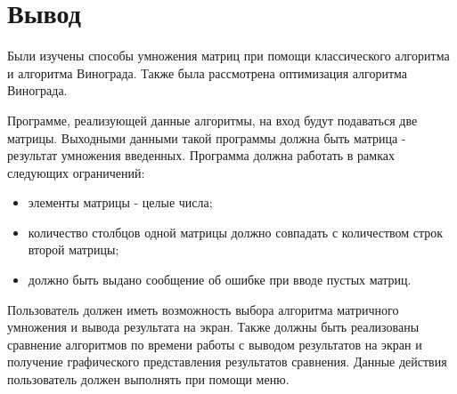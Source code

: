 \section{Вывод}

Были изучены способы умножения матриц при помощи классического алгоритма и алгоритма Винограда. Также была рассмотрена оптимизация алгоритма Винограда.

Программе, реализующей данные алгоритмы, на вход будут подаваться две матрицы. Выходными данными такой программы должна быть матрица - результат умножения введенных. Программа должна работать в рамках следующих ограничений: 

\begin{itemize}
	\item элементы матрицы - целые числа;
	\item количество столбцов одной матрицы должно совпадать с количеством строк второй матрицы;
	\item должно быть выдано сообщение об ошибке при вводе пустых матриц.
\end{itemize}

Пользователь должен иметь возможность выбора алгоритма матричного умножения и вывода результата на экран. Также должны быть реализованы сравнение алгоритмов по времени работы с выводом результатов на экран и получение графического представления результатов сравнения. Данные действия пользователь должен выполнять при помощи меню.
